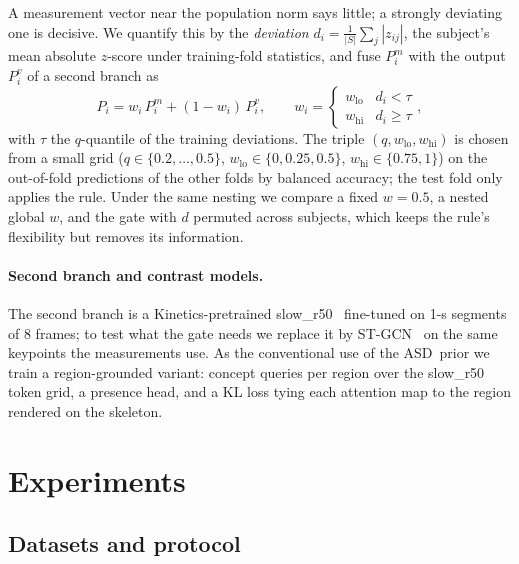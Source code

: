 \documentclass[runningheads]{llncs}
\newcommand{\asd}{ASD}
\begin{document}
A measurement vector near the population norm says little; a strongly deviating one is
decisive. We quantify this by the \emph{deviation}
$d_i=\frac{1}{|S|}\sum_{j}|z_{ij}|$, the subject's mean absolute $z$-score under
training-fold statistics, and fuse $P^{m}_i$ with the output $P^{v}_i$ of a second branch as
\begin{equation}
P_i=w_i\,P^{m}_i+(1-w_i)\,P^{v}_i,\qquad
w_i=\begin{cases} w_{\mathrm{lo}} & d_i<\tau\\ w_{\mathrm{hi}} & d_i\ge\tau\end{cases},
\label{eq:gate}
\end{equation}
with $\tau$ the $q$-quantile of the training deviations. The triple
$(q,w_{\mathrm{lo}},w_{\mathrm{hi}})$ is chosen from a small grid
($q\in\{0.2,\ldots,0.5\}$, $w_{\mathrm{lo}}\in\{0,0.25,0.5\}$, $w_{\mathrm{hi}}\in\{0.75,1\}$)
on the out-of-fold predictions of the other folds by balanced accuracy; the test fold only
applies the rule. Under the same nesting we compare a fixed $w{=}0.5$, a nested global $w$,
and the gate with $d$ permuted across subjects, which keeps the rule's flexibility but
removes its information.

\paragraph{Second branch and contrast models.} The second branch is a Kinetics-pretrained
slow\_r50~\cite{feichtenhofer2019slowfast} fine-tuned on 1-s segments of 8 frames; to test
what the gate needs we replace it by ST-GCN~\cite{yan2018stgcn} on the same keypoints the
measurements use. As the conventional use of the \asd\ prior we train a region-grounded
variant: concept queries per region over the slow\_r50 token grid, a presence head, and a
KL loss tying each attention map to the region rendered on the skeleton.

\section{Experiments}

\subsection{Datasets and protocol}
\label{sec:protocol}
\end{document}

